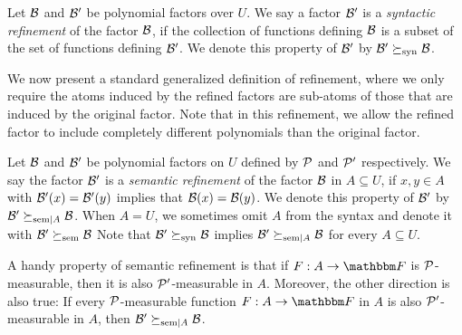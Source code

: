 \begin{definition}
    Let $\mathcal{B}$ and $\mathcal{B}^\prime$ be polynomial factors over $U$.
    We say a factor $\mathcal{B}^\prime$ is a \emph{syntactic refinement} of the factor $\mathcal{B}$, if the collection of functions defining $\mathcal{B}$ is a subset of the set
    of functions defining $\mathcal{B}^\prime$.
    We denote this property of $\mathcal{B}^\prime$ by $\mathcal{B}^\prime \succeq_{\text{syn}} \mathcal{B}$.
\end{definition}
We now present a standard generalized definition of refinement, where we only require the atoms induced by the refined factors are sub-atoms of those that are induced by the original factor.
Note that in this refinement, we allow the refined factor to include completely different polynomials than the original factor.
\begin{definition}\label{def:semantic-refinement}
    Let $\mathcal{B}$ and $\mathcal{B}^\prime$ be polynomial factors on $U$ defined by $\genpolyset$ and $\genpolyset^{\prime}$ respectively.
    We say the factor $\mathcal{B}^\prime$ is a \emph{semantic refinement} of the factor $\mathcal{B}$ in $A \subseteq U$,
    if $x, y \in A$ with $\mathcal{B}^\prime(x) = \mathcal{B}^\prime(y)$ implies that $\mathcal{B}(x)=\mathcal{B}(y)$.
    We denote this property of $\mathcal{B}^\prime$ by $\mathcal{B}^\prime \succeq_{\text{sem}|A} \mathcal{B}$.
    When $A = U$, we sometimes omit $A$ from the syntax and denote it with $\mathcal{B}^{\prime} \succeq_{\text{sem}} \mathcal{B}$
    \newline
    Note that $\mathcal{B}^\prime \succeq_{\text{syn}} \mathcal{B}$ implies $\mathcal{B}^\prime \succeq_{\text{sem}|A} \mathcal{B}$ for every $A \subseteq U$.
\end{definition}
\begin{remark}
    A handy property of semantic refinement is that if $\funcdef{\genfunc}{A}{\basefield}$ is $\genpolyset$-measurable,
    then it is also $\genpolyset^{\prime}$-measurable in $A$.
    Moreover, the other direction is also true:
    If every $\genpolyset$-measurable function $\funcdef{\genfunc}{A}{\basefield}$ in $A$ is also $\genpolyset^{\prime}$-measurable in $A$, then $\mathcal{B}^{\prime} \succeq_{\text{sem}|A} \mathcal{B}$.
\end{remark}

